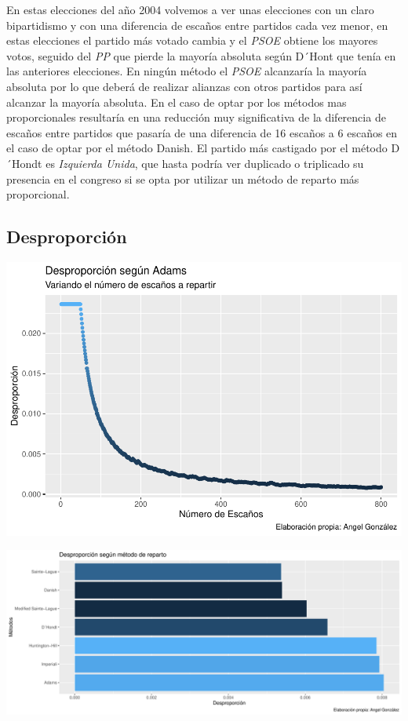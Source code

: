 \documentclass[12pt,a4paper,]{book}
\numberwithin{dummy}{section}
\theoremstyle{ocrenumbox}
\theoremstyle{blacknumex}
\theoremstyle{blacknumbox}
\theoremstyle{ocrenum}
\theoremstyle{ocrenum}
\begin{document}
En estas elecciones del año 2004 volvemos a ver unas elecciones con un
claro bipartidismo y con una diferencia de escaños entre partidos cada
vez menor, en estas elecciones el partido más votado cambia y el
\emph{PSOE} obtiene los mayores votos, seguido del \emph{PP} que pierde
la mayoría absoluta según D´Hont que tenía en las anteriores elecciones.
En ningún método el \emph{PSOE} alcanzaría la mayoría absoluta por lo
que deberá de realizar alianzas con otros partidos para así alcanzar la
mayoría absoluta. En el caso de optar por los métodos mas proporcionales
resultaría en una reducción muy significativa de la diferencia de
escaños entre partidos que pasaría de una diferencia de 16 escaños a 6
escaños en el caso de optar por el método Danish. El partido más
castigado por el método D´Hondt es \emph{Izquierda Unida}, que hasta
podría ver duplicado o triplicado su presencia en el congreso si se opta
por utilizar un método de reparto más proporcional.

\hypertarget{desproporciuxf3n-8}{%
\subsection{Desproporción}\label{desproporciuxf3n-8}}

\begin{center}\includegraphics[width=1\linewidth]{figurasR/unnamed-chunk-30-1} \end{center}

\begin{center}\includegraphics[width=1\linewidth]{figurasR/unnamed-chunk-30-2} \end{center}
\end{document}
